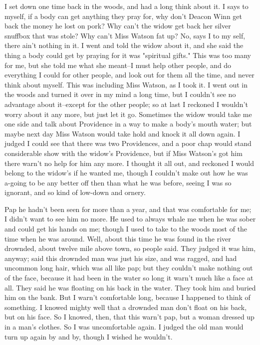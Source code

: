 I set down one time back in the woods, and had a long think about it.  I
says to myself, if a body can get anything they pray for, why don't
Deacon Winn get back the money he lost on pork?  Why can't the widow get
back her silver snuffbox that was stole?  Why can't Miss Watson fat up?
No, says I to my self, there ain't nothing in it.  I went and told the
widow about it, and she said the thing a body could get by praying for it
was "spiritual gifts."  This was too many for me, but she told me what
she meant--I must help other people, and do everything I could for other
people, and look out for them all the time, and never think about myself.
This was including Miss Watson, as I took it.  I went out in the woods
and turned it over in my mind a long time, but I couldn't see no
advantage about it--except for the other people; so at last I reckoned I
wouldn't worry about it any more, but just let it go.  Sometimes the
widow would take me one side and talk about Providence in a way to make a
body's mouth water; but maybe next day Miss Watson would take hold and
knock it all down again.  I judged I could see that there was two
Providences, and a poor chap would stand considerable show with the
widow's Providence, but if Miss Watson's got him there warn't no help for
him any more.  I thought it all out, and reckoned I would belong to the
widow's if he wanted me, though I couldn't make out how he was a-going to
be any better off then than what he was before, seeing I was so ignorant,
and so kind of low-down and ornery.

Pap he hadn't been seen for more than a year, and that was comfortable
for me; I didn't want to see him no more.  He used to always whale me
when he was sober and could get his hands on me; though I used to take to
the woods most of the time when he was around.  Well, about this time he
was found in the river drownded, about twelve mile above town, so people
said.  They judged it was him, anyway; said this drownded man was just
his size, and was ragged, and had uncommon long hair, which was all like
pap; but they couldn't make nothing out of the face, because it had been
in the water so long it warn't much like a face at all.  They said he was
floating on his back in the water.  They took him and buried him on the
bank.  But I warn't comfortable long, because I happened to think of
something.  I knowed mighty well that a drownded man don't float on his
back, but on his face.  So I knowed, then, that this warn't pap, but a
woman dressed up in a man's clothes.  So I was uncomfortable again.  I
judged the old man would turn up again by and by, though I wished he
wouldn't.

